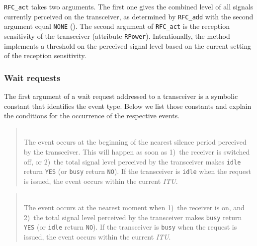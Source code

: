 {\tt RFC\_act} takes two arguments.
The first one gives the combined level of all signals currently perceived
on the transceiver, as determined by {\tt RFC\_add} with the second argument
equal {\tt NONE} ().
The second argument of {\tt RFC\_act} is the reception sensitivity of the
transceiver (attribute {\tt RPower}).
Intentionally, the method implements a threshold on the perceived signal
level based on the current setting of the reception sensitivity.

\subsubsection{Wait requests}
\label{rm_tr_pp_wr}

The first argument of a wait request addressed to a transceiver is a symbolic
constant that identifies the event type.
Below we list those constants and explain the conditions for the
occurrence of the respective events.

\medskip

\begin{quote}
\noindent{}\\ \hspace{0in}
The event occurs at the beginning of the nearest silence
period perceived by the transceiver.
This will happen as soon as 1)~the receiver is switched off, or 2)~the
total signal level perceived by the transceiver makes {\tt idle}
return {\tt YES} (or {\tt busy} return {\tt NO}).
If the transceiver is {\tt idle} 
when the request is issued,
the event occurs within the current {\em ITU}.
\end{quote}

\begin{quote}
\noindent{}\\ \hspace{0in}
The event occurs at the nearest moment when 1)~the receiver is on, and 2)~the
total signal level perceived by the transceiver makes {\tt busy} return
{\tt YES} (or {\tt idle} return {\tt NO}).
If the transceiver is {\tt busy} when the request is issued,
the event occurs within the current {\em ITU}.
\end{quote}

